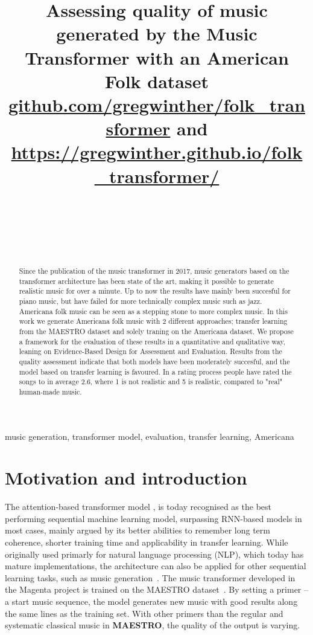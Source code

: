 \documentclass{IEEEtran}
\title{Assessing quality of music generated by the Music Transformer with an
American Folk dataset \\
\normalsize{\url{github.com/gregwinther/folk_transformer} and
\url{https://gregwinther.github.io/folk_transformer/}}}
\author{
    \IEEEauthorblockN{Sebastian G. Winther-Larsen} \\
    \IEEEauthorblockA{\textit{Center for Computing in Science Education,
        Department of Physics, University of Oslo} \\
    }
    \and
    \IEEEauthorblockN{Tom F.Hansen} \\
    \IEEEauthorblockA{\textit{Institute of Informatics, University of Oslo} \\ }
    \and
    \IEEEauthorblockN{Bjørn Iversen} \\
    \IEEEauthorblockA{\textit{Institute of Informatics, University of Oslo} \\ }
}
\begin{document}
\maketitle

\begin{abstract}
    Since the publication of the music transformer in 2017,
    music generators based on the transformer architecture has been state of the
    art, making it possible to generate realistic music for over a minute. Up to now
    the results have mainly been succesful for piano music, but have failed for
    more technically complex music such as jazz. Americana folk music can be seen
    as a stepping stone to more complex music. In this work we generate Americana
    folk music with 2 different approaches; transfer learning from the MAESTRO
    dataset and solely traning on the Americana dataset. We propose a framework for
    the evaluation of these results in a quantitative and qualitative way, leaning on Evidence-Based Design 
    for Assessment and Evaluation. Results from the quality
    assessment indicate that both models have been moderately succesful, and the
    model based on transfer learning is favoured. In a rating process people have
    rated the songs to in average 2.6, where 1 is not realistic and 5 is
    realistic, compared to "real" human-made music.
\end{abstract}

\begin{IEEEkeywords}
    music generation, transformer model, evaluation,
    transfer learning, Americana
\end{IEEEkeywords}

\section{Motivation and introduction}

The attention-based transformer model \cite{vaswani2017attention}, is today
recognised as the best performing sequential machine learning model,
surpassing RNN-based models in most cases, mainly argued by its better
abilities to remember long term coherence, shorter training time and
applicability in transfer learning. While originally used primarly for
natural language processing (NLP), which today has mature implementations,
the architecture can also be applied for other sequential learning tasks,
such as music generation~\cite{huang2018music}. The music transformer
developed in the Magenta project is trained on the MAESTRO
dataset~\cite{maestrodataset}. By setting a primer – a start music sequence,
the model generates new music with good results along the same lines as the
training set. With other primers than the regular and systematic classical
music in \textbf{MAESTRO}, the quality of the output is varying.
\end{document}
